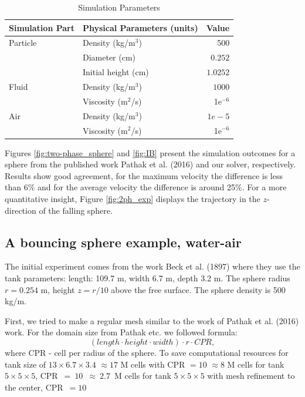 \begin{table}[H]
    \centering
    \caption{Simulation Parameters} \label{table2-chap4}
    \begin{tabular}{llr}
        \toprule
        \hline
        Simulation Part         & Physical Parameters (units) & Value \\
        \hline
        \midrule
        Particle                 & Density (kg/m$^3$)          & 500    \\
                         & Diameter (cm)          & $0.252$    \\
                         & Initial height (cm)          & $1.0252$    \\
                         \hline
        Fluid                  & Density (kg/m$^3$)           & $1000$   \\
                                & Viscosity (m$^2$/s)         & 1e$^{-6}$    \\
                                \hline
         Air                  & Density (kg/m$^3$)           & $1e-5$   \\
                                & Viscosity (m$^2$/s)         & 1e$^{-6}$    \\
                                \hline
        \bottomrule
     \end{tabular}
\end{table}
Figures \ref{fig:two-phase_sphere} and \ref{fig:IB} present the simulation outcomes for a sphere from the published work Pathak et al. (2016) \cite{pathak20163d} and our solver, respectively. Results show good agreement, for the maximum velocity the difference is less than 6\% and for the average velocity the difference is around 25\%. For a more quantitative insight, Figure \ref{fig:2ph_exp} displays the trajectory in the $z$-direction of the falling sphere.

\subsection{A bouncing sphere example, water-air}
The initial experiment comes from the work Beck et al. (1897) \cite{beck1987transient} where they use the tank parameters: length: 109.7 m, width 6.7 m, depth 3.2 m. The sphere radius $r= 0.254$ m, height $z = r/10$ above the free surface. The sphere density is 500 kg/m.

First, we tried to make a regular mesh similar to the work of Pathak et al. (2016) \cite{pathak20163d} work. For the domain size from Pathak etc.\cite{pathak20163d} we followed formula:
\begin{equation}
    (length \cdot height \cdot width)  \cdot  r  \cdot  CPR,
\end{equation}
where CPR - cell per radius of the sphere. To save computational resources for tank size of $13\times 6.7 \times 3.4$ $\approx 17$ M cells with CPR $= 10$ $\approx 8$ M cells for tank $5\times 5 \times 5$, CPR~$=~10$~$\approx~2.7$~M cells for tank $5\times 5 \times 5$ with mesh refinement to the center, CPR~$= 10$

